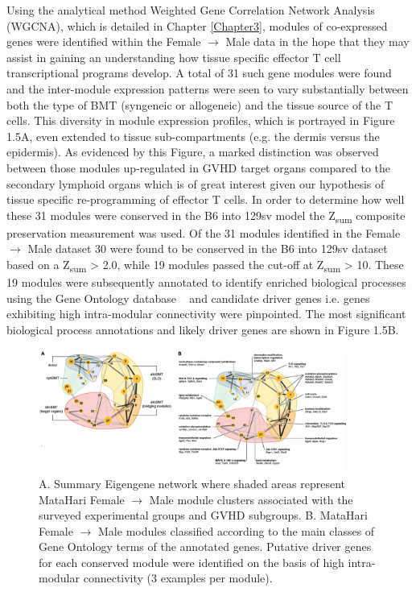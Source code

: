 Using the analytical method Weighted Gene Correlation Network Analysis (WGCNA), which is detailed in Chapter \ref{Chapter3}, modules of co-expressed genes were identified within the Female $\to$ Male data in the hope that they may assist in gaining an understanding how tissue specific effector T cell transcriptional programs develop. A total of 31 such gene modules were found and the inter-module expression patterns were seen to vary substantially between both the type of BMT (syngeneic or allogeneic) and the tissue source of the T cells. This diversity in module expression profiles, which is portrayed in Figure 1.5A, even extended to tissue sub-compartments (e.g. the dermis versus the epidermis). As evidenced by this Figure, a marked distinction was observed between those modules up-regulated in GVHD target organs compared to the secondary lymphoid organs which is of great interest given our hypothesis of tissue specific re-programming of effector T cells. In order to determine how well these 31 modules were conserved in the B6 into 129sv model the Z\textsubscript{sum} composite preservation measurement was used. Of the 31 modules identified in the Female $\to$ Male dataset 30 were found to be conserved in the B6 into 129sv dataset based on a Z\textsubscript{sum} > 2.0, while 19 modules passed the cut-off at Z\textsubscript{sum} > 10. These 19 modules were subsequently annotated to identify enriched biological processes using the Gene Ontology database ~\autocite{Ash2000,GO2015} and candidate driver genes i.e. genes exhibiting high intra-modular connectivity were pinpointed. The most significant biological process annotations and likely driver genes are shown in Figure 1.5B. 

\begin{figure}[H] 
    \centering
   \includegraphics[width=0.9\textwidth]{Figures/Chapter1/MH_mods.png}
\caption{\small{A. Summary Eigengene network where shaded areas represent MataHari Female $\to$ Male module clusters associated with the surveyed experimental groups and GVHD subgroups. B. MataHari Female $\to$ Male modules classified according to the main classes of Gene Ontology terms of the annotated genes. Putative driver genes for each conserved module were identified on the basis of high intra-modular connectivity (3 examples per module).} }
    \label{fig:5}
\end{figure}


